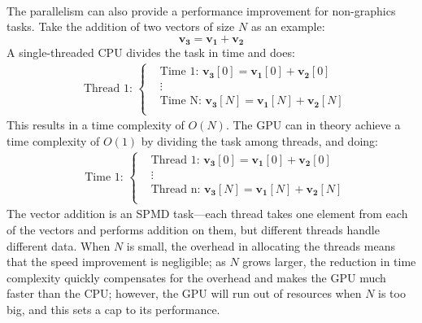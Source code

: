 \documentclass[12pt, twocolumn]{report}
\begin{document}
\paragraph{}
The parallelism can also provide a performance improvement for non-graphics tasks. Take the addition of two vectors of size $N$ as an example:
\begin{equation*}
    \boldsymbol{v_3} = \boldsymbol{v_1} + \boldsymbol{v_2}
\end{equation*}
A single-threaded CPU divides the task in time and does:
\begin{align*}
    & \text{Thread 1: }
\begin{cases}
    & \text{Time 1: } \boldsymbol{v_3}[0] = \boldsymbol{v_1}[0] + \boldsymbol{v_2}[0] \\
    & \vdots \\
    & \text{Time N: } \boldsymbol{v_3}[N] = \boldsymbol{v_1}[N] + \boldsymbol{v_2}[N] \\
\end{cases}
\end{align*}
This results in a time complexity of $O(N)$. The GPU can in theory achieve a time complexity of $O(1)$ by dividing the task among threads, and doing:
\begin{align*}
    & \text{Time 1: }
\begin{cases}
    & \text{Thread 1: } \boldsymbol{v_3}[0] = \boldsymbol{v_1}[0] + \boldsymbol{v_2}[0] \\
    & \vdots \\
    & \text{Thread n: } \boldsymbol{v_3}[N] = \boldsymbol{v_1}[N] + \boldsymbol{v_2}[N] \\
\end{cases}
\end{align*}
The vector addition is an SPMD task---each thread takes one element from each of the vectors and performs addition on them, but different threads handle different data. When $N$ is small, the overhead in allocating the threads means that the speed improvement is negligible; as $N$ grows larger, the reduction in time complexity quickly compensates for the overhead and makes the GPU much faster than the CPU; however, the GPU will run out of resources when $N$ is too big, and this sets a cap to its performance.
\end{document}

